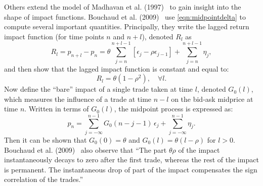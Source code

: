 Others extend the model of Madhavan et al. (1997)~\cite{madhaven1997} to gain insight into the shape of impact functions.  Bouchaud et al. (2009)~\cite{bouchaud2009} use \eqref{eqn:midpointdelta} to compute several important quantities. Principally, they write the lagged return impact function (for time points $n$ and $n+l$), denoted $R_l$ as
	\begin{equation} \label{eqn:rlittlel}
	R_l = p_{n+l}-p_n = \theta \sum_{j=n}^{n+l-1}[\epsilon_j - \rho \epsilon_{j-1}]+ \sum_{j=n}^{n+l-1} \eta_j,
	\end{equation}
and then show that the lagged impact function is constant and equal to:
	\begin{equation} \label{eqn:rlittlel2}
	R_l = \theta (1-\rho^2), \quad \forall l.
	\end{equation}
Now define the ``bare'' impact of a single trade taken at time $l$, denoted $G_0(l)$, which measures the influence of a trade at time $n-l$ on the bid-ask midprice at time $n$. Written in terms of $G_0(l)$, the midpoint process is expressed as:
	\begin{equation} \label{eqn:plittlen}
	p_n = \sum_{j=-\infty}^{n-1} G_0 (n - j - 1)\,\epsilon_j + \sum_{j=-\infty}^{n-1} \eta_j.
	\end{equation}
Then it can be shown that $G_0(0) = \theta$ and $G_0(l) = \theta(l-\rho)$ for $l>0$. Bouchaud et al. (2009)~\cite{bouchaud2009} also observe that ``The part $\theta \rho$ of the impact instantaneously decays to zero after the first trade, whereas the rest of the impact is permanent. The instantaneous drop of part of the impact compensates the sign correlation of the trades.''


